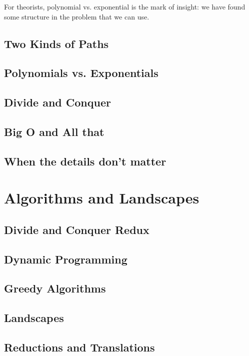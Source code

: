 \documentclass[]{article}
\begin{document}
For theorists, polynomial vs. exponential is the mark of insight: we have found some structure in the problem that we can use.

\subsection{Two Kinds of Paths}

\subsection{Polynomials vs. Exponentials}

\subsection{Divide and Conquer}

\subsection{Big O and All that}

\subsection{When the details don't matter}

\section{Algorithms and Landscapes}
\cite[Chapter 2]{moore2011nature}

\subsection{Divide and Conquer Redux}

\subsection{Dynamic Programming}

\subsection{Greedy Algorithms}

\subsection{Landscapes}

\subsection{Reductions and Translations}
\end{document}
